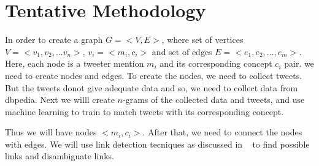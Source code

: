 \chapter{Tentative Methodology}\label{ch3}
In order to create a graph $G = <V,E>$, where set of vertices $V = <v_1,v_2,... v_n>$, $v_i = <m_i, c_i>$ and
set of edges $E = <e_1, e_2,...,e_m>$.
Here, each node is a tweeter mention $m_i$ and its corresponding concept $c_i$ pair.
 we need to create nodes and edges.
To create the nodes, we need to collect tweets. But the tweets donot give adequate data and so, 
we need to collect data from dbpedia. Next we willl create $n$-grams of the collected data and tweets,
 and use machine learning to train to match tweets with its corresponding concept.

 Thus we will have nodes $<m_i, c_i>$. After that, we need to connect the nodes with edges. 
 We will use link detection tecniques as discussed in ~\cite{ref3LinkWikipedia} to 
 find possible links and disambiguate links.


\endinput